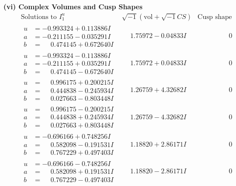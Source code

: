 \documentclass[1p]{elsarticle_modified}
\theoremstyle{definition}
\newcommand{\I}{\sqrt{-1}}
\begin{document}
\newpage\flushleft \textbf{(vi) Complex Volumes and Cusp Shapes}
$$\begin{array}{c|c|c}  
\text{Solutions to }I^u_{1}& \I (\text{vol} + \sqrt{-1}CS) & \text{Cusp shape}\\
 \hline 
\begin{aligned}
u &= -0.993324 + 0.113886 I \\
a &= -0.211155 - 0.035291 I \\
b &= \phantom{-}0.474145 + 0.672640 I\end{aligned}
 & \phantom{-}1.75972 - 0.04833 I & \phantom{-0.000000 } 0 \\ \hline\begin{aligned}
u &= -0.993324 - 0.113886 I \\
a &= -0.211155 + 0.035291 I \\
b &= \phantom{-}0.474145 - 0.672640 I\end{aligned}
 & \phantom{-}1.75972 + 0.04833 I & \phantom{-0.000000 } 0 \\ \hline\begin{aligned}
u &= \phantom{-}0.996175 + 0.200215 I \\
a &= \phantom{-}0.444838 - 0.245934 I \\
b &= \phantom{-}0.027663 - 0.803448 I\end{aligned}
 & \phantom{-}1.26759 + 4.32682 I & \phantom{-0.000000 } 0 \\ \hline\begin{aligned}
u &= \phantom{-}0.996175 - 0.200215 I \\
a &= \phantom{-}0.444838 + 0.245934 I \\
b &= \phantom{-}0.027663 + 0.803448 I\end{aligned}
 & \phantom{-}1.26759 - 4.32682 I & \phantom{-0.000000 } 0 \\ \hline\begin{aligned}
u &= -0.696166 + 0.748256 I \\
a &= \phantom{-}0.582098 - 0.191531 I \\
b &= \phantom{-}0.767229 + 0.497403 I\end{aligned}
 & \phantom{-}1.18820 + 2.86171 I & \phantom{-0.000000 } 0 \\ \hline\begin{aligned}
u &= -0.696166 - 0.748256 I \\
a &= \phantom{-}0.582098 + 0.191531 I \\
b &= \phantom{-}0.767229 - 0.497403 I\end{aligned}
 & \phantom{-}1.18820 - 2.86171 I & \phantom{-0.000000 } 0 \\ \hline\begin{aligned}

\end{aligned}
\end{array}$$
\end{document}

